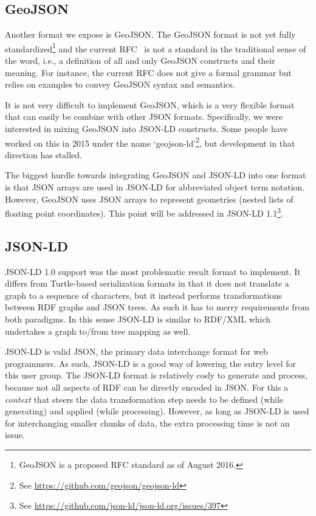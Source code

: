 \documentclass[a4paper]{scrartcl}
\begin{document}
\subsection{GeoJSON}
\label{sec:geojson}

Another format we expose is GeoJSON.  The GeoJSON format is not yet
fully standardized\footnote{GeoJSON is a proposed RFC standard as of
  August 2016.} and the current RFC~\cite{Butler2016} is not a
standard in the traditional sense of the word, i.e., a definition of
all and only GeoJSON constructs and their meaning.  For instance, the
current RFC does not give a formal grammar but relies on examples to
convey GeoJSON syntax and semantics.

It is not very difficult to implement GeoJSON, which is a very
flexible format that can easily be combine with other JSON formats.
Specifically, we were interested in mixing GeoJSON into JSON-LD
constructs.  Some people have worked on this in 2015 under the name
`geojson-ld'\footnote{See
  \url{https://github.com/geojson/geojson-ld}}, but development in
that direction has stalled.

The biggest hurdle towards integrating GeoJSON and JSON-LD into one
format is that JSON arrays are used in JSON-LD for abbreviated object
term notation.  However, GeoJSON uses JSON arrays to represent
geometries (nested lists of floating point coordinates).
This point will be addressed in JSON-LD 1.1\footnote{See \url{https://github.com/json-ld/json-ld.org/issues/397}}.


\subsection{JSON-LD}
\label{sec:jsonld}

JSON-LD 1.0 support was the most problematic result format to
implement.  It differs from Turtle-based serialization formats in that
it does not translate a graph to a sequence of characters, but it
instead performs transformations between RDF graphs and JSON trees.
As such it has to merry requirements from both paradigms.  In this
sense JSON-LD is similar to RDF/XML which undertakes a graph to/from
tree mapping as well.

JSON-LD is valid JSON, the primary data interchange format for web
programmers.  As such, JSON-LD is a good way of lowering the entry
level for this user group.  The JSON-LD format is relatively cosly to
generate and process, because not all aspects of RDF can be directly
encoded in JSON.  For this a \emph{context} that steers the data
transformation step needs to be defined (while generating) and applied
(while processing).  However, as long as JSON-LD is used for
interchanging smaller chunks of data, the extra processing time is not
an issue.
\end{document}
